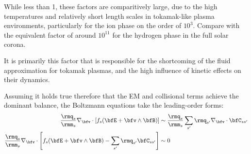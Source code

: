     \begin{remark}
        While less than 1, these factors are comparitively large, due to the high temperatures and relatively short length scales in tokamak-like plasma environments, particularly for the ion phase on the order of $10^{3}$. Compare with the equivalent factor of around $10^{11}$ for the hydrogen phase in the full solar corona.

        It is primarily this factor that is responsible for the shortcoming of the fluid approximation for tokamak plasmas, and the high influence of kinetic effects on their dynamics.
    \end{remark}

    Assuming it holds true therefore that the EM and collisional terms achieve the dominant balance, the Boltzmann equations take the leading-order forms:
    \begin{align}\label{eqn:leading-order Boltzmann equation}
        \frac{\rmq_{s}}{\rmm_{s}}\nabla_{\bfv}\cdot[f_{s}(\bfE + \bfv\wedge\bfB)]  &\sim  \frac{\rmq_{s}}{\rmm_{s}}\sum_{s'}\rmq_{s'}\nabla_{\bfv}\cdot\bfC_{ss'}  \\
        \frac{\rmq_{s}}{\rmm_{s}}\nabla_{\bfv}\cdot\left[f_{s}(\bfE + \bfv\wedge\bfB) - \sum_{s'}\rmq_{s'}\bfC_{ss'}\right]  &\sim  0
    \end{align}
    